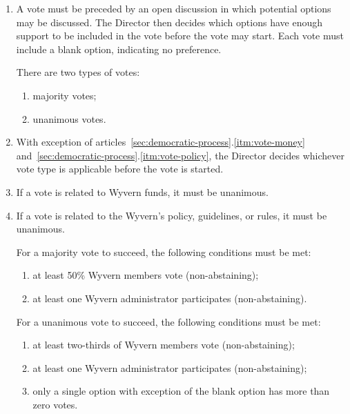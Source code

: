 \begin{enumerate}
    \item A vote must be preceded by an open discussion in which potential options may be discussed. The Director then decides which options have enough support to be included in the vote before the vote may start. Each vote must include a blank option, indicating no preference.

    \begin{item}
        There are two types of votes:
        \begin{enumerate}
            \item majority votes;
            \item unanimous votes.
        \end{enumerate}
    \end{item}

    \item With exception of articles~\ref{sec:democratic-process}.\ref{itm:vote-money} and~\ref{sec:democratic-process}.\ref{itm:vote-policy}, the Director decides whichever vote type is applicable before the vote is started.

    \item \label{itm:vote-money} If a vote is related to Wyvern funds, it must be unanimous.

    \item \label{itm:vote-policy} If a vote is related to the Wyvern's policy, guidelines, or rules, it must be unanimous.

    \begin{item}
        For a majority vote to succeed, the following conditions must be met:
        \begin{enumerate}
            \item at least 50\% Wyvern members vote (non-abstaining);
            \item at least one Wyvern administrator participates (non-abstaining).
        \end{enumerate}
    \end{item}

    \begin{item}
        For a unanimous vote to succeed, the following conditions must be met:
        \begin{enumerate}
            \item at least two-thirds of Wyvern members vote (non-abstaining);
            \item at least one Wyvern administrator participates (non-abstaining);
            \item only a single option with exception of the blank option has more than zero votes.
        \end{enumerate}
    \end{item}


\end{enumerate}
